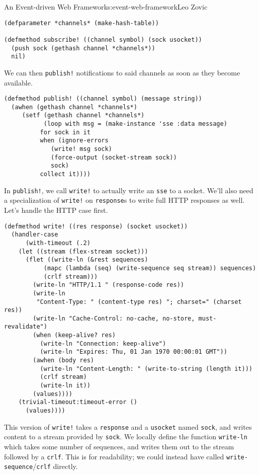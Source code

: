 \begin{aosachapter}{An Event-driven Web Framework}{s:event-web-framework}{Leo Zovic}
\begin{verbatim}
(defparameter *channels* (make-hash-table))

(defmethod subscribe! ((channel symbol) (sock usocket))
  (push sock (gethash channel *channels*))
  nil)
\end{verbatim}

We can then \texttt{publish!} notifications to said channels as soon as
they become available.

\begin{verbatim}
(defmethod publish! ((channel symbol) (message string))
  (awhen (gethash channel *channels*)
     (setf (gethash channel *channels*)
           (loop with msg = (make-instance 'sse :data message)
          for sock in it
          when (ignore-errors
             (write! msg sock)
             (force-output (socket-stream sock))
             sock)
          collect it))))
\end{verbatim}

In \texttt{publish!}, we call \texttt{write!} to actually write an
\texttt{sse} to a socket. We'll also need a specialization of
\texttt{write!} on \texttt{response}s to write full HTTP responses as
well. Let's handle the HTTP case first.

\begin{verbatim}
(defmethod write! ((res response) (socket usocket))
  (handler-case
      (with-timeout (.2)
    (let ((stream (flex-stream socket)))
      (flet ((write-ln (&rest sequences)
           (mapc (lambda (seq) (write-sequence seq stream)) sequences)
           (crlf stream)))
        (write-ln "HTTP/1.1 " (response-code res))
        (write-ln
         "Content-Type: " (content-type res) "; charset=" (charset res))
        (write-ln "Cache-Control: no-cache, no-store, must-revalidate")
        (when (keep-alive? res)
          (write-ln "Connection: keep-alive")
          (write-ln "Expires: Thu, 01 Jan 1970 00:00:01 GMT"))
        (awhen (body res)
          (write-ln "Content-Length: " (write-to-string (length it)))
          (crlf stream)
          (write-ln it))
        (values))))
    (trivial-timeout:timeout-error ()
      (values))))
\end{verbatim}

This version of \texttt{write!} takes a \texttt{response} and a
\texttt{usocket} named \texttt{sock}, and writes content to a stream
provided by \texttt{sock}. We locally define the function
\texttt{write-ln} which takes some number of sequences, and writes them
out to the stream followed by a \texttt{crlf}. This is for readability;
we could instead have called \texttt{write-sequence}/\texttt{crlf}
directly.


\end{aosachapter}
